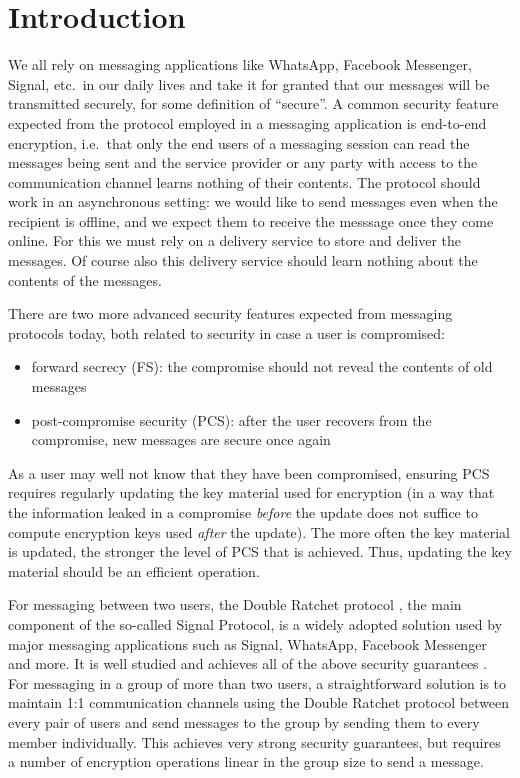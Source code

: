 \section{Introduction}

We all rely on messaging applications like WhatsApp, Facebook Messenger, Signal, etc.\ in our daily lives and take it for granted that our messages will be transmitted securely, for some definition of ``secure''. A common security feature expected from the protocol employed in a messaging application is end-to-end encryption, i.e.\ that only the end users of a messaging session can read the messages being sent and the service provider or any party with access to the communication channel learns nothing of their contents. The protocol should work in an asynchronous setting: we would like to send messages even when the recipient is offline, and we expect them to receive the messsage once they come online. For this we must rely on a delivery service to store and deliver the messages. Of course also this delivery service should learn nothing about the contents of the messages.

There are two more advanced security features expected from messaging protocols today, both related to security in case a user is compromised:
\begin{itemize}
	\item forward secrecy (FS): the compromise should not reveal the contents of old messages
	\item post-compromise security (PCS): after the user recovers from the compromise, new messages are secure once again
\end{itemize}
As a user may well not know that they have been compromised, ensuring PCS requires regularly updating the key material used for encryption (in a way that the information leaked in a compromise \emph{before} the update does not suffice to compute encryption keys used \emph{after} the update). The more often the key material is updated, the stronger the level of PCS that is achieved. Thus, updating the key material should be an efficient operation.

For messaging between two users, the Double Ratchet protocol \cite{double-ratchet}, the main component of the so-called Signal Protocol, is a widely adopted solution used by major messaging applications such as Signal, WhatsApp, Facebook Messenger and more. It is well studied and achieves all of the above security guarantees \cite{double-ratchet-analysis}. For messaging in a group of more than two users, a straightforward solution is to maintain 1:1 communication channels using the Double Ratchet protocol between every pair of users and send messages to the group by sending them to every member individually. This achieves very strong security guarantees, but requires a number of encryption operations linear in the group size to send a message.

